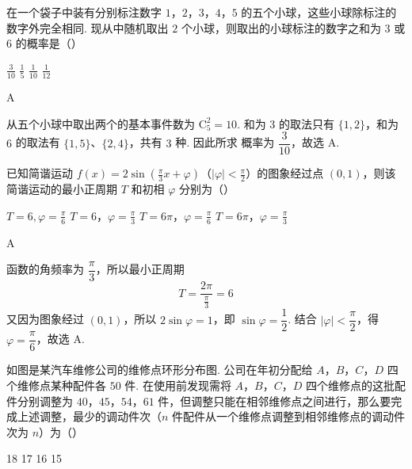 \begin{problem}
在一个袋子中装有分别标注数字 \(1\)，\(2\)，\(3\)，\(4\)，\(5\) 的五个小球，这些小球除标注的数字外完全相同. 现从中随机取出 \(2\) 个小球，则取出的小球标注的数字之和为 \(3\) 或 \(6\) 的概率是（\quad）

\choices
    {\(\frac{3}{10}\)}
    {\(\frac{1}{5}\)}
    {\(\frac{1}{10}\)}
    {\(\frac{1}{12}\)}
\end{problem}

\begin{answer}
A
\end{answer}

\begin{solution}
从五个小球中取出两个的基本事件数为 \(\mathrm C_{5}^{2}=10\). 和为 \(3\) 的取法只有
\(\{1,2\}\)，和为 \(6\) 的取法有 \(\{1,5\}\)、\(\{2,4\}\)，共有 \(3\) 种. 因此所求
概率为 \(\dfrac{3}{10}\)，故选 A.
\end{solution}

\begin{problem}
已知简谐运动 \( f(x) = 2\sin \left(\frac{\pi}{3} x + \varphi\right) \)（\(|\varphi| < \frac{\pi}{2}\)）的图象经过点 \((0,1)\)，则该简谐运动的最小正周期 \(T\) 和初相 \(\varphi\) 分别为（\quad）

\choices
    {\(T = 6, \varphi = \frac{\pi}{6}\)}
    {\(T = 6\)，\(\varphi = \frac{\pi}{3}\)}
    {\(T = 6\pi\)，\(\varphi = \frac{\pi}{6}\)}
    {\(T = 6\pi\)，\(\varphi = \frac{\pi}{3}\)}
\end{problem}

\begin{answer}
A
\end{answer}

\begin{solution}
函数的角频率为 \(\dfrac{\pi}{3}\)，所以最小正周期
\[
T=\frac{2\pi}{\frac{\pi}{3}}=6
\]
又因为图象经过 \((0,1)\)，所以 \(2\sin\varphi=1\)，即
\(\sin\varphi=\dfrac{1}{2}\). 结合 \(|\varphi|<\dfrac{\pi}{2}\)，得
\(\varphi=\dfrac{\pi}{6}\)，故选 A.
\end{solution}

\begin{problem}
如图是某汽车维修公司的维修点环形分布图. 公司在年初分配给 \(A\)，\(B\)，\(C\)，\(D\) 四个维修点某种配件各 \(50\text{ 件}\). 在使用前发现需将 \(A\)，\(B\)，\(C\)，\(D\) 四个维修点的这批配件分别调整为 \(40\)，\(45\)，\(54\)，\(61\) 件，但调整只能在相邻维修点之间进行，那么要完成上述调整，最少的调动件次（\(n\) 件配件从一个维修点调整到相邻维修点的调动件次为 \(n\)）为（\quad）


\choices
    {18}
    {17}
    {16}
    {15}
\end{problem}

